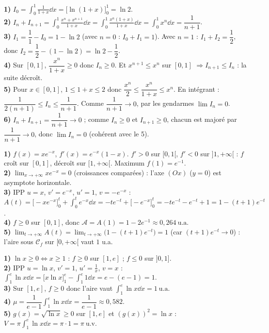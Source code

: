\textbf{1)} $I_0=\displaystyle\int_0^1\frac{1}{1+x}\dd x=\big[\ln(1+x)\big]_0^1=\ln 2$.\\
\textbf{2)} $I_n+I_{n+1}=\displaystyle\int_0^1\frac{x^n+x^{n+1}}{1+x}\dd x=\int_0^1\frac{x^n(1+x)}{1+x}\dd x
=\int_0^1 x^n\dd x=\dfrac{1}{n+1}$.\\
\textbf{3)} $I_1=\dfrac{1}{1}-I_0=1-\ln 2$ (avec $n=0$ : $I_0+I_1=1$).\;
Avec $n=1$ : $I_1+I_2=\dfrac12$, donc $I_2=\dfrac12-(1-\ln2)=\ln 2-\dfrac12$.\\
\textbf{4)} Sur $[0,1]$, $\dfrac{x^n}{1+x}\ge0$ donc $I_n\ge0$. Et $x^{n+1}\le x^n$ sur $[0,1]$
$\Rightarrow I_{n+1}\le I_n$ : la suite décroît.\\
\textbf{5)} Pour $x\in[0,1]$, $1\le 1+x\le2$ donc $\dfrac{x^n}{2}\le\dfrac{x^n}{1+x}\le x^n$. En intégrant :
$\dfrac{1}{2(n+1)}\le I_n\le\dfrac1{n+1}$. Comme $\dfrac1{n+1}\to0$, par les gendarmes $\displaystyle\lim I_n=0$.\\
\textbf{6)} $I_n+I_{n+1}=\dfrac1{n+1}\to0$ ; comme $I_n\ge0$ et $I_{n+1}\ge0$, chacun est majoré par
$\dfrac1{n+1}\to0$, donc $\lim I_n=0$ (cohérent avec le 5).

\textbf{1)} $f(x)=xe^{-x}$, $f'(x)=e^{-x}(1-x)$. $f'>0$ sur $[0,1[$, $f'<0$ sur $]1,+\infty[$ :
$f$ croît sur $[0,1]$, décroît sur $[1,+\infty[$. Maximum $f(1)=e^{-1}$.\\
\textbf{2)} $\displaystyle\lim_{x\to+\infty}xe^{-x}=0$ (croissances comparées) : l'axe $(Ox)$
($y=0$) est asymptote horizontale.\\
\textbf{3)} IPP $u=x$, $v'=e^{-x}$, $u'=1$, $v=-e^{-x}$ :
$A(t)=\big[-xe^{-x}\big]_0^t+\int_0^t e^{-x}\dd x=-te^{-t}+\big[-e^{-x}\big]_0^t=-te^{-t}-e^{-t}+1
=1-(t+1)e^{-t}$.\\
\textbf{4)} $f\ge0$ sur $[0,1]$, donc $\mathcal A=A(1)=1-2e^{-1}\approx0{,}264\ \text{u.a.}$\\
\textbf{5)} $\displaystyle\lim_{t\to+\infty}A(t)=\lim_{t\to+\infty}\big(1-(t+1)e^{-t}\big)=1$
(car $(t+1)e^{-t}\to0$) : l'aire sous $\mathcal C_f$ sur $[0,+\infty[$ vaut $1$ u.a.

\textbf{1)} $\ln x\ge0\iff x\ge1$ : $f\ge0$ sur $[1,e]$ ; $f\le0$ sur $]0,1]$.\\
\textbf{2)} IPP $u=\ln x$, $v'=1$, $u'=\frac1x$, $v=x$ :
$\displaystyle\int_1^e\ln x\dd x=\big[x\ln x\big]_1^e-\int_1^e 1\dd x=e-(e-1)=1$.\\
\textbf{3)} Sur $[1,e]$, $f\ge0$ donc l'aire vaut $\displaystyle\int_1^e\ln x\dd x=1\ \text{u.a.}$\\
\textbf{4)} $\mu=\dfrac{1}{e-1}\displaystyle\int_1^e\ln x\dd x=\dfrac{1}{e-1}\approx0{,}582$.\\
\textbf{5)} $g(x)=\sqrt{\ln x}\ge0$ sur $[1,e]$ et $(g(x))^2=\ln x$ :
$V=\pi\displaystyle\int_1^e\ln x\dd x=\pi\cdot1=\pi\ \text{u.v.}$

